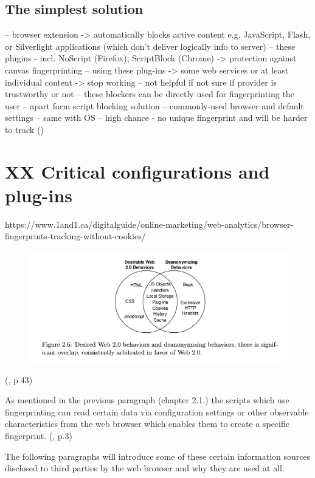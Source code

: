 \subsection{The simplest solution}

-- browser extension -> automatically blocks active content e.g. JavaScript, Flash, or Silverlight applications (which don't deliver logically info to server)
-- these plugins - incl. NoScript (Firefox), ScriptBlock (Chrome) -> protection against canvas fingerprinting
-- using these plug-ins -> some web services or at least individual content -> stop working
-- not helpful if not sure if provider is trustworthy or not
-- these blockers can be directly used for fingerprinting the user
-- apart form script blocking solution
-- commonly-used browser and default settings
-- same with OS
-- high chance - no unique fingerprint and will be harder to track
(\textcite{web17})



\newpage
\section{XX Critical configurations and plug-ins}


https://www.1and1.ca/digitalguide/online-marketing/web-analytics/browser-fingerprints-tracking-without-cookies/

\begin{figure}
	\centering
	\includegraphics[width=0.7\linewidth]{images/dangerousConfigs}
	\caption{}
	\label{fig:dangerousconfigs}
\end{figure}
(\textcite{mayer09}, p.43)

As mentioned in the previous paragraph (chapter 2.1.) the scripts which use fingerprinting can read certain data via configuration settings or other observable characteristics from the web browser which enables them to create a specific fingerprint. (\textcite{doty18}, p.3)

The following paragraphs will introduce some of these certain information sources disclosed to third parties by the web browser and why they are used at all.


